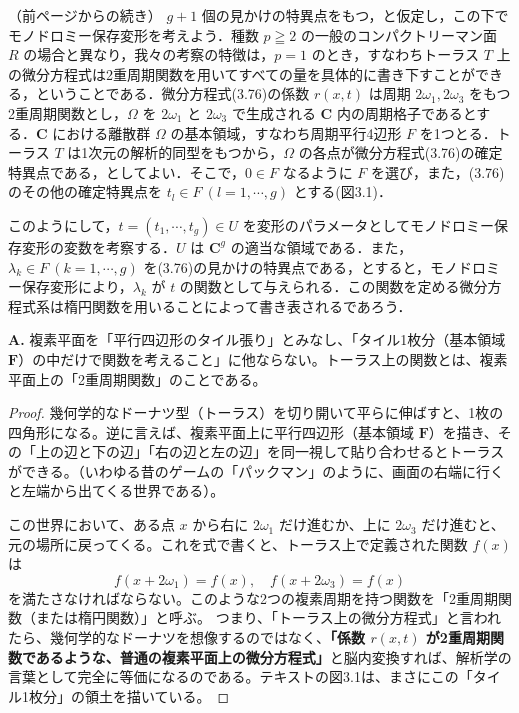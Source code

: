 \begin{story}
（前ページからの続き）
$g+1$ 個の見かけの特異点をもつ，と仮定し，この下でモノドロミー保存変形を考えよう．種数 $p \geqq 2$ の一般のコンパクトリーマン面 $R$ の場合と異なり，我々の考察の特徴は，$p=1$ のとき，すなわちトーラス $T$ 上の微分方程式は2重周期関数を用いてすべての量を具体的に書き下すことができる，ということである．微分方程式(3.76)の係数 $r(x, t)$ は周期 $2\omega_1, 2\omega_3$ をもつ2重周期関数とし，$\Omega$ を $2\omega_1$ と $2\omega_3$ で生成される $\mathbf{C}$ 内の周期格子であるとする．$\mathbf{C}$ における離散群 $\Omega$ の基本領域，すなわち周期平行4辺形 $F$ を1つとる．トーラス $T$ は1次元の解析的同型をもつから，$\Omega$ の各点が微分方程式(3.76)の確定特異点である，としてよい．そこで，$0 \in F$ なるように $F$ を選び，また，(3.76)のその他の確定特異点を $t_l \in F \ (l=1, \cdots, g)$ とする(図3.1)．

このようにして，$t=(t_1, \cdots, t_g) \in U$ を変形のパラメータとしてモノドロミー保存変形の変数を考察する．$U$ は $\mathbf{C}^g$ の適当な領域である．また，$\lambda_k \in F \ (k=1, \cdots, g)$ を(3.76)の見かけの特異点である，とすると，モノドロミー保存変形により，$\lambda_k$ が $t$ の関数として与えられる．この関数を定める微分方程式系は楕円関数を用いることによって書き表されるであろう．
\end{story}

\begin{Q}
\textbf{A.} 複素平面を「平行四辺形のタイル張り」とみなし、「タイル1枚分（基本領域 $\boldsymbol{F}$）の中だけで関数を考えること」に他ならない。トーラス上の関数とは、複素平面上の「2重周期関数」のことである。

\begin{proof}
幾何学的なドーナツ型（トーラス）を切り開いて平らに伸ばすと、1枚の四角形になる。逆に言えば、複素平面上に平行四辺形（基本領域 $\boldsymbol{F}$）を描き、その「上の辺と下の辺」「右の辺と左の辺」を同一視して貼り合わせるとトーラスができる。（いわゆる昔のゲームの「パックマン」のように、画面の右端に行くと左端から出てくる世界である）。

この世界において、ある点 $x$ から右に $2\omega_1$ だけ進むか、上に $2\omega_3$ だけ進むと、元の場所に戻ってくる。これを式で書くと、トーラス上で定義された関数 $f(x)$ は
\begin{equation*}
f(x + 2\omega_1) = f(x), \quad f(x + 2\omega_3) = f(x)
\end{equation*}
を満たさなければならない。このような2つの複素周期を持つ関数を「2重周期関数（または楕円関数）」と呼ぶ。
つまり、「トーラス上の微分方程式」と言われたら、幾何学的なドーナツを想像するのではなく、\textbf{「係数 $r(x,t)$ が2重周期関数であるような、普通の複素平面上の微分方程式」}と脳内変換すれば、解析学の言葉として完全に等価になるのである。テキストの図3.1は、まさにこの「タイル1枚分」の領土を描いている。
\end{proof}
\end{Q}

